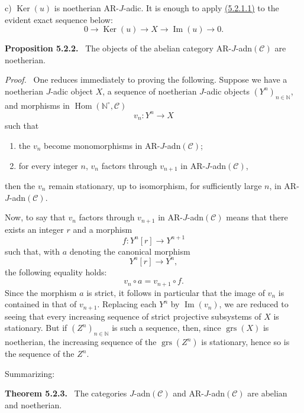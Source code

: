 \documentclass[11pt]{article}
\newenvironment{statement}[1]{\par\medskip\noindent\textbf{#1.}\ }{\par\medskip}
\newenvironment{prooftext}[1][Proof]{\par\noindent\emph{#1.}\ }{\par\medskip}
\DeclareMathOperator{\Hom}{Hom}
\providecommand{\Ker}{\operatorname{Ker}}
\providecommand{\Hom}{\operatorname{Hom}}
\providecommand{\Im}{\operatorname{Im}}
\providecommand{\Ker}{\operatorname{Ker}}
\renewcommand{\Im}{\operatorname{Im}}
\providecommand{\grs}{\operatorname{grs}}
\providecommand{\Ker}{\operatorname{Ker}}
\providecommand{\Im}{\operatorname{Im}}
\providecommand{\Hom}{\operatorname{Hom}}
\begin{document}
c) \(\Ker(u)\) is noetherian AR-\(J\)-adic. It is enough to apply \hyperref[sga5:V:lemma:5.2.1.1]{(5.2.1.1)} to the evident exact sequence below:
\[
0\longrightarrow \Ker(u)\longrightarrow X\longrightarrow \Im(u)\longrightarrow0.
\]

\label{sga5:V:proposition:5.2.2}\begin{statement}{Proposition 5.2.2}
The objects of the abelian category AR-\(J\)-adn\((\mathcal C)\) are noetherian.
\end{statement}

\begin{prooftext}
One reduces immediately to proving the following. Suppose we have a noetherian \(J\)-adic object \(X\), a sequence of noetherian \(J\)-adic objects \((Y^n)_{n\in\mathbb N}\), and morphisms in \(\Hom(\mathbb N^\circ,\mathcal C)\)
\[
v_n:Y^n\longrightarrow X
\]
such that
\begin{enumerate}[label=\textup{(\roman*)}]
\item the \(v_n\) become monomorphisms in AR-\(J\)-adn\((\mathcal C)\);
\item for every integer \(n\), \(v_n\) factors through \(v_{n+1}\) in AR-\(J\)-adn\((\mathcal C)\),
\end{enumerate}
then the \(v_n\) remain stationary, up to isomorphism, for sufficiently large \(n\), in AR-\(J\)-adn\((\mathcal C)\).

Now, to say that \(v_n\) factors through \(v_{n+1}\) in AR-\(J\)-adn\((\mathcal C)\) means that there exists an integer \(r\) and a morphism
\[
f:Y^n[r]\longrightarrow Y^{n+1}
\]
such that, with \(a\) denoting the canonical morphism
\[
Y^n[r]\longrightarrow Y^n,
\]
the following equality holds:
\[
v_n\circ a=v_{n+1}\circ f .
\]
Since the morphism \(a\) is strict, it follows in particular that the image of \(v_n\) is contained in that of \(v_{n+1}\). Replacing each \(Y^n\) by \(\Im(v_n)\), we are reduced to seeing that every increasing sequence of strict projective subsystems of \(X\) is stationary. But if \((Z^n)_{n\in\mathbb N}\) is such a sequence, then, since \(\grs(X)\) is noetherian, the increasing sequence of the \(\grs(Z^n)\) is stationary, hence so is the sequence of the \(Z^n\).
\end{prooftext}

Summarizing:

\label{sga5:V:theorem:5.2.3}\begin{statement}{Theorem 5.2.3}
The categories \(J\)-adn\((\mathcal C)\) and AR-\(J\)-adn\((\mathcal C)\) are abelian and noetherian.
\end{statement}
\end{document}

